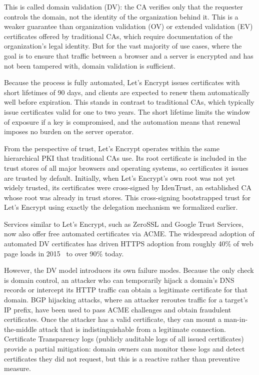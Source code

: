 \documentclass[11pt]{article}
\begin{document}
This is called domain validation (DV): the CA verifies only that the requester
controls the domain, not the identity of the organization behind it. This is a
weaker guarantee than organization validation (OV) or extended validation (EV)
certificates offered by traditional CAs, which require documentation of the
organization's legal identity. But for the vast majority of use cases,
where the goal is to ensure that traffic between a browser and a server
is encrypted and has not been tampered with, domain validation is sufficient.

Because the process is fully automated, Let's Encrypt issues certificates with
short lifetimes of 90 days, and clients are expected to renew them automatically
well before expiration. This stands in contrast to traditional CAs, which
typically issue certificates valid for one to two years. The short lifetime
limits the window of exposure if a key is compromised, and the automation means
that renewal imposes no burden on the server operator.

From the perspective of trust, Let's Encrypt operates within the same
hierarchical PKI that traditional CAs use. Its root certificate is included
in the trust stores of all major browsers and operating systems, so certificates
it issues are trusted by default. Initially, when Let's Encrypt's own root was
not yet widely trusted, its certificates were cross-signed by IdenTrust, an
established CA whose root was already in trust stores. This cross-signing
bootstrapped trust for Let's Encrypt using exactly the delegation mechanism
we formalized earlier.

Services similar to Let's Encrypt, such as ZeroSSL and Google Trust Services,
now also offer free automated certificates via ACME. The widespread adoption of
automated DV certificates has driven HTTPS adoption from roughly 40\% of web
page loads in 2015~\citep{Felt17usenix} to over 90\% today.

However, the DV model introduces its own failure modes. Because the only check
is domain control, an attacker who can temporarily hijack a domain's DNS records
or intercept its HTTP traffic can obtain a legitimate certificate for that
domain. BGP hijacking attacks, where an attacker reroutes traffic for a target's
IP prefix, have been used to pass ACME challenges and obtain fraudulent
certificates. Once the attacker has a valid certificate, they can mount a
man-in-the-middle attack that is indistinguishable from a legitimate connection.
Certificate Transparency logs (publicly auditable logs of all issued
certificates) provide a partial mitigation: domain owners can monitor these logs
and detect certificates they did not request, but this is a reactive rather than
preventive measure.
\end{document}
